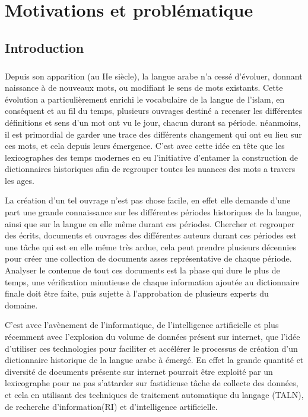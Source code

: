 \documentclass[]{report}
\begin{document}
 

\tableofcontents

\listoffigures
	
\chapter{Motivations et problématique}
	\section{Introduction}
		\paragraph{}
		Depuis son apparition (au IIe siècle), la langue arabe n'a cessé d'évoluer, donnant naissance à de nouveaux mots, ou modifiant le sens de mots existants. Cette évolution a particulièrement enrichi le vocabulaire de la langue de l'islam, en conséquent et au fil du temps, plusieurs ouvrages destiné a recenser les différentes définitions et sens d'un mot ont vu le jour, chacun durant sa période. néanmoins,  il est primordial de garder une trace des différents changement qui ont eu lieu sur ces mots, et cela depuis leurs émergence. C'est avec cette idée en tête que les lexicographes des temps modernes en eu l'initiative d'entamer la construction de dictionnaires historiques afin de regrouper toutes les nuances des mots a travers les ages.
		\par
		La création d'un tel ouvrage n'est pas chose facile, en effet elle demande d'une part une grande connaissance sur les différentes périodes historiques de la langue, ainsi que sur la langue en elle même durant ces périodes. Chercher et regrouper des écrits, documents et ouvrages des différentes auteurs durant ces périodes est une tâche qui est en elle même très ardue, cela peut prendre plusieurs décennies pour créer une collection de documents asses représentative de chaque période. Analyser le contenue de tout ces documents est la phase qui dure le plus de temps, une vérification minutieuse de chaque information ajoutée au dictionnaire finale doit être faite, puis sujette à l'approbation de plusieurs experts du domaine.
		\par
		C'est avec l'avènement de l'informatique, de l'intelligence artificielle et plus récemment avec l'explosion du volume de données présent sur internet, que l'idée d'utiliser ces technologies pour faciliter et accélérer le processus de création d'un dictionnaire historique de la langue arabe à émergé. En effet la grande quantité et diversité de documents présente sur internet pourrait être exploité par un lexicographe pour ne pas s'attarder sur fastidieuse tâche de collecte des données, et cela en utilisant des techniques de traitement automatique du langage (TALN), de recherche d'information(RI) et d'intelligence artificielle.
\end{document}
